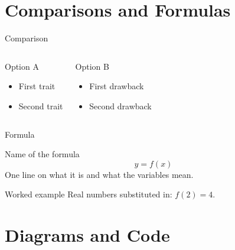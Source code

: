 \section{Comparisons and Formulas}

\begin{frame}{Comparison}
  \begin{columns}
      \begin{block}{Option A}
        \begin{itemize}
          \item First trait
          \item Second trait
        \end{itemize}
      \end{block}
      \begin{alertblock}{Option B}
        \begin{itemize}
          \item First drawback
          \item Second drawback
        \end{itemize}
      \end{alertblock}
  \end{columns}
\end{frame}

\begin{frame}{Formula}
  \begin{block}{Name of the formula}
    \[
      y = f(x)
    \]
    One line on what it is and what the variables mean.
  \end{block}
  \vspace{0.3cm}
  \begin{exampleblock}{Worked example}
    Real numbers substituted in: $f(2) = 4$.
  \end{exampleblock}
\end{frame}

\section{Diagrams and Code}

